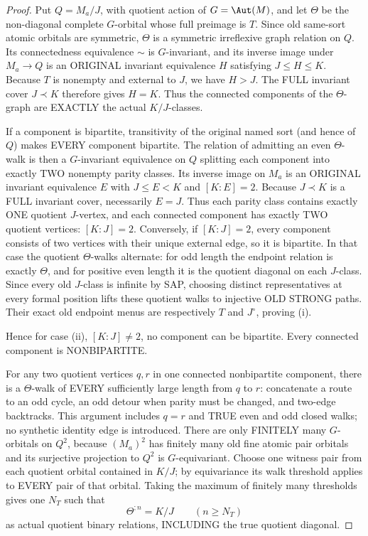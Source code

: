 \begin{proof}
Put $Q=M_a/J$, with quotient action of
$G=\Aut(M)$, and let $\Theta$ be the non-diagonal
complete $G$-orbital whose full preimage is $T$.
Since old same-sort atomic orbitals are symmetric,
$\Theta$ is a symmetric irreflexive graph relation
on $Q$. Its connectedness equivalence $\sim$ is
$G$-invariant, and its inverse image under
$M_a\to Q$ is an ORIGINAL invariant equivalence
$H$ satisfying $J\le H\le K$.
Because $T$ is nonempty and external to $J$, we
have $H>J$. The FULL invariant cover $J\prec K$
therefore gives $H=K$. Thus the connected
components of the $\Theta$-graph are EXACTLY
the actual $K/J$-classes.

If a component is bipartite, transitivity of
the original named sort (and hence of $Q$)
makes EVERY component bipartite. The relation
of admitting an even $\Theta$-walk is then
a $G$-invariant equivalence on $Q$ splitting
each component into exactly TWO nonempty
parity classes. Its inverse image on $M_a$
is an ORIGINAL invariant equivalence $E$
with $J\le E<K$ and $[K:E]=2$.
Because $J\prec K$ is a FULL invariant cover,
necessarily $E=J$. Thus each parity class
contains exactly ONE quotient $J$-vertex,
and each connected component has exactly
TWO quotient vertices: $[K:J]=2$.
Conversely, if $[K:J]=2$, every component
consists of two vertices with their unique
external edge, so it is bipartite.
In that case the quotient $\Theta$-walks
alternate: for odd length the endpoint
relation is exactly $\Theta$, and for
positive even length it is the quotient
diagonal on each $J$-class. Since every
old $J$-class is infinite by SAP, choosing
distinct representatives at every formal
position lifts these quotient walks to
injective OLD STRONG paths. Their exact
old endpoint menus are respectively
$T$ and $J^\circ$, proving (i).

Hence for case (ii), $[K:J]\ne2$, no
component can be bipartite. Every
connected component is NONBIPARTITE.

For any two quotient vertices $q,r$ in one
connected nonbipartite component, there is a
$\Theta$-walk of EVERY sufficiently large length
from $q$ to $r$: concatenate a route to an odd
cycle, an odd detour when parity must be changed,
and two-edge backtracks. This argument includes
$q=r$ and TRUE even and odd closed walks; no
synthetic identity edge is introduced.
There are only FINITELY many $G$-orbitals on
$Q^2$, because $(M_a)^2$ has finitely many
old fine atomic pair orbitals and its surjective
projection to $Q^2$ is $G$-equivariant.
Choose one witness pair from each quotient
orbital contained in $K/J$; by equivariance
its walk threshold applies to EVERY pair of
that orbital. Taking the maximum of finitely
many thresholds gives one $N_T$ such that
\[
                 \Theta^{;n}=K/J
                 \qquad(n\ge N_T)
\]
as actual quotient binary relations, INCLUDING
the true quotient diagonal.


\end{proof}
